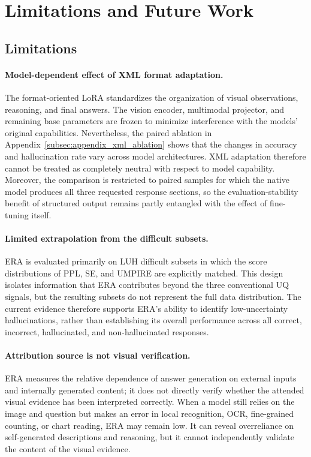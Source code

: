 \section{Limitations and Future Work}
\label{sec:limitations}

\subsection{Limitations}

\paragraph{Model-dependent effect of XML format adaptation.}
The format-oriented LoRA standardizes the organization of visual observations, reasoning, and final answers. The vision encoder, multimodal projector, and remaining base parameters are frozen to minimize interference with the models' original capabilities. Nevertheless, the paired ablation in Appendix~\ref{subsec:appendix_xml_ablation} shows that the changes in accuracy and hallucination rate vary across model architectures. XML adaptation therefore cannot be treated as completely neutral with respect to model capability. Moreover, the comparison is restricted to paired samples for which the native model produces all three requested response sections, so the evaluation-stability benefit of structured output remains partly entangled with the effect of fine-tuning itself.

\paragraph{Limited extrapolation from the difficult subsets.}
ERA is evaluated primarily on LUH difficult subsets in which the score distributions of PPL, SE, and UMPIRE are explicitly matched. This design isolates information that ERA contributes beyond the three conventional UQ signals, but the resulting subsets do not represent the full data distribution. The current evidence therefore supports ERA's ability to identify low-uncertainty hallucinations, rather than establishing its overall performance across all correct, incorrect, hallucinated, and non-hallucinated responses.

\paragraph{Attribution source is not visual verification.}
ERA measures the relative dependence of answer generation on external inputs and internally generated content; it does not directly verify whether the attended visual evidence has been interpreted correctly. When a model still relies on the image and question but makes an error in local recognition, OCR, fine-grained counting, or chart reading, ERA may remain low. It can reveal overreliance on self-generated descriptions and reasoning, but it cannot independently validate the content of the visual evidence.

